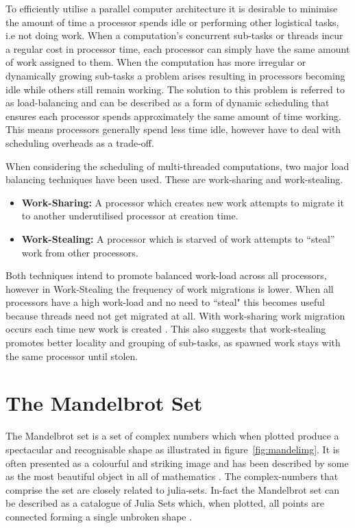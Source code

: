 To efficiently utilise a parallel computer architecture it is desirable to minimise
the amount of time a processor spends idle or performing other logistical tasks, i.e not doing work. 
When a computation's concurrent sub-tasks or \glspl{thread} incur a regular cost in processor
time, each processor can simply have the same amount of work assigned to them. When the computation has
more irregular or dynamically growing sub-tasks a problem arises resulting in 
processors becoming idle while others still remain working. The solution to this problem is referred to as
\gls{load-balancing} and can be described as a form of dynamic scheduling that ensures each processor 
spends approximately the same amount of time working. This means processors generally spend
less time idle, however have to deal with scheduling overheads as a trade-off.

When considering the scheduling of multi-threaded computations, two major load balancing techniques have been used.
These are \gls{work-sharing} and \gls{work-stealing}.

\begin{itemize}
\item \textbf{Work-Sharing:} A processor which creates new work attempts to migrate it to another underutilised processor at creation time. 
\item \textbf{Work-Stealing:} A processor which is starved of work attempts to ``steal'' work from other processors. 
\end{itemize}

Both techniques intend to promote balanced work-load across all processors, however in Work-Stealing
the frequency of work migrations is lower. When all processors have a 
high work-load and no need to ``steal" this becomes useful because threads need not get 
migrated at all. With \gls{work-sharing} work migration occurs each time new work is created \cite{blumleis}.
This also suggests that \gls{work-stealing} promotes better \gls{locality} and grouping of sub-tasks, as spawned work 
stays with the same processor until stolen.

\section{The Mandelbrot Set}

The Mandelbrot set is a set of complex numbers which when plotted produce a spectacular and recognisable shape as illustrated in figure~\ref{fig:mandelimg}.
It is often presented as a colourful and striking image and has been described by some as the most beautiful object in all of mathematics 
\cite[p.~234]{chaosfract}.
The \glspl{complex-number} that comprise the set are closely related to \glspl{julia-set}. 
In-fact the Mandelbrot set can be described as a catalogue of Julia Sets which, when plotted, all points are connected 
forming a single unbroken shape \cite[p.~177]{fractimg}.

